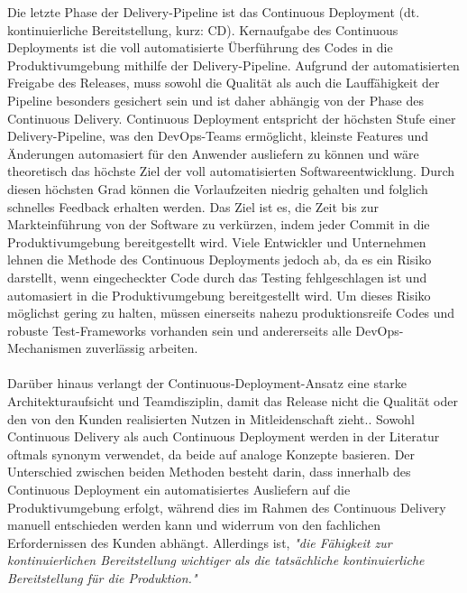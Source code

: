 Die letzte Phase der Delivery-Pipeline ist das Continuous Deployment (dt. kontinuierliche Bereitstellung, kurz: CD). Kernaufgabe des Continuous Deployments ist die voll automatisierte Überführung des Codes in die Produktivumgebung mithilfe der Delivery-Pipeline. \cite[S. 29]{alt_innovationsorientiertes_2017} Aufgrund der automatisierten Freigabe des Releases, muss sowohl die Qualität als auch die Lauffähigkeit der Pipeline besonders gesichert sein und ist daher abhängig von der Phase des Continuous Delivery. \cite[S. 269]{tiemeyer_handbuch_2021} Continuous Deployment entspricht der höchsten Stufe einer Delivery-Pipeline, was den DevOps-Teams ermöglicht, kleinste Features und Änderungen automasiert für den Anwender ausliefern zu können und wäre theoretisch das höchste Ziel der voll automatisierten Softwareentwicklung. \cite{humble_why_2011} Durch diesen höchsten Grad können die Vorlaufzeiten niedrig gehalten und folglich schnelles Feedback erhalten werden. \cite{humble_why_2011} Das Ziel ist es, die Zeit bis zur Markteinführung von der Software zu verkürzen, indem jeder Commit in die Produktivumgebung bereitgestellt wird. Viele Entwickler und Unternehmen lehnen die Methode des Continuous Deployments jedoch ab, da es ein Risiko darstellt, wenn eingecheckter Code durch das Testing fehlgeschlagen ist und automasiert in die Produktivumgebung bereitgestellt wird. \cite[S. 269]{tiemeyer_handbuch_2021} Um dieses Risiko möglichst gering zu halten, müssen einerseits nahezu produktionsreife Codes und robuste Test-Frameworks vorhanden sein und andererseits alle DevOps-Mechanismen zuverlässig arbeiten. \cite[S. 269]{tiemeyer_handbuch_2021}\\\\  Darüber hinaus verlangt der Continuous-Deployment-Ansatz eine starke Architekturaufsicht und Teamdisziplin, damit das Release nicht die Qualität oder den von den Kunden realisierten Nutzen in Mitleidenschaft zieht.\cite[S. 119 - 120]{erder_continuous_2016}. Sowohl Continuous Delivery als auch Continuous Deployment werden in der Literatur oftmals synonym verwendet, da beide auf analoge Konzepte basieren. Der Unterschied zwischen beiden Methoden besteht darin, dass innerhalb des Continuous Deployment ein automatisiertes Ausliefern auf die Produktivumgebung erfolgt, während dies im Rahmen des Continuous Delivery manuell entschieden werden kann und widerrum von den fachlichen Erfordernissen des Kunden abhängt. \cite[S. 29 - 30]{alt_innovationsorientiertes_2017} Allerdings ist, \textit{"die Fähigkeit zur kontinuierlichen Bereitstellung wichtiger als die tatsächliche kontinuierliche Bereitstellung für die Produktion."} \cite[S. 19]{sharma_devops_2017}

